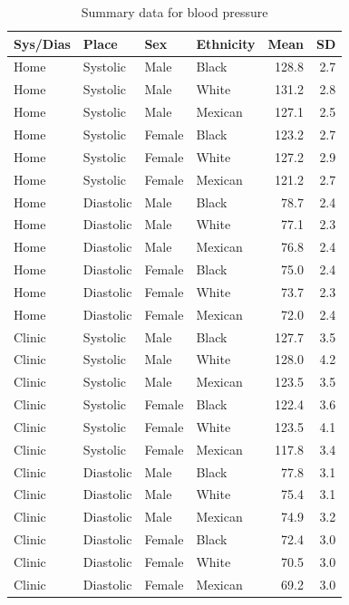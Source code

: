 \documentclass[
]{article}
\begin{document}
\begin{table}[!h]
\caption{\label{tab:summaries}Summary data for blood pressure}
\centering
\begin{tabular}[t]{llllrr}
\toprule
Sys/Dias & Place & Sex & Ethnicity & Mean & SD\\
\midrule
Home & Systolic & Male & Black & 128.8 & 2.7\\
Home & Systolic & Male & White & 131.2 & 2.8\\
Home & Systolic & Male & Mexican & 127.1 & 2.5\\
Home & Systolic & Female & Black & 123.2 & 2.7\\
Home & Systolic & Female & White & 127.2 & 2.9\\
Home & Systolic & Female & Mexican & 121.2 & 2.7\\
\addlinespace
Home & Diastolic & Male & Black & 78.7 & 2.4\\
Home & Diastolic & Male & White & 77.1 & 2.3\\
Home & Diastolic & Male & Mexican & 76.8 & 2.4\\
Home & Diastolic & Female & Black & 75.0 & 2.4\\
Home & Diastolic & Female & White & 73.7 & 2.3\\
Home & Diastolic & Female & Mexican & 72.0 & 2.4\\
\addlinespace
Clinic & Systolic & Male & Black & 127.7 & 3.5\\
Clinic & Systolic & Male & White & 128.0 & 4.2\\
Clinic & Systolic & Male & Mexican & 123.5 & 3.5\\
Clinic & Systolic & Female & Black & 122.4 & 3.6\\
Clinic & Systolic & Female & White & 123.5 & 4.1\\
Clinic & Systolic & Female & Mexican & 117.8 & 3.4\\
\addlinespace
Clinic & Diastolic & Male & Black & 77.8 & 3.1\\
Clinic & Diastolic & Male & White & 75.4 & 3.1\\
Clinic & Diastolic & Male & Mexican & 74.9 & 3.2\\
Clinic & Diastolic & Female & Black & 72.4 & 3.0\\
Clinic & Diastolic & Female & White & 70.5 & 3.0\\
Clinic & Diastolic & Female & Mexican & 69.2 & 3.0\\
\bottomrule
\end{tabular}
\end{table}
\end{document}

